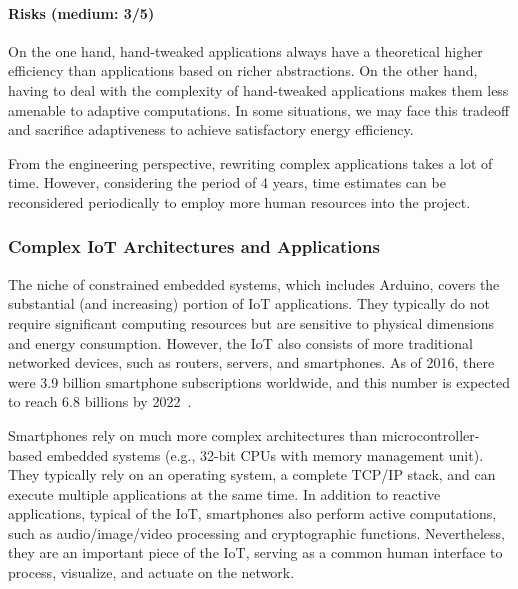 \documentclass[12pt,english]{amsart}
\begin{document}
\paragraph{\textbf{Risks (medium: 3/5)}}

On the one hand, hand-tweaked applications always have a theoretical higher
efficiency than applications based on richer abstractions.
On the other hand, having to deal with the complexity of hand-tweaked
applications makes them less amenable to adaptive computations.
In some situations, we may face this tradeoff and sacrifice adaptiveness to
achieve satisfactory energy efficiency.

From the engineering perspective, rewriting complex applications takes a lot of
time.
However, considering the period of 4 years, time estimates can
be reconsidered periodically to employ more human resources into the project.

\subsubsection{Complex IoT Architectures and Applications}
\label{sec.method.complex}

The niche of constrained embedded systems, which includes Arduino, covers the
substantial (and increasing) portion of IoT applications.
They typically do not require significant computing resources but are sensitive
to physical dimensions and energy consumption.
%
However, the IoT also consists of more traditional networked devices, such as
routers, servers, and smartphones.
%
As of 2016, there were 3.9 billion smartphone subscriptions worldwide, and
this number is expected to reach 6.8 billions by 2022~\cite{ericsson.mobility}.

Smartphones rely on much more complex architectures than microcontroller-based
embedded systems (e.g., 32-bit CPUs with memory management unit).
They typically rely on an operating system, a complete TCP/IP stack, and can
execute multiple applications at the same time.
In addition to reactive applications, typical of the IoT, smartphones also
perform active computations, such as audio/image/video processing and
cryptographic functions.
Nevertheless, they are an important piece of the IoT, serving as a common human
interface to process, visualize, and actuate on the network.
\end{document}
